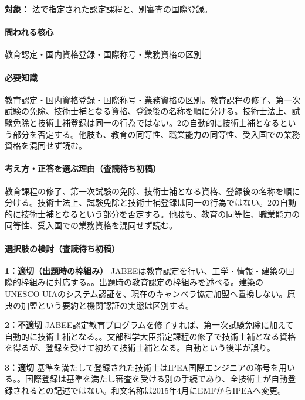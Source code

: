 \noindent\textbf{対象：} 法で指定された認定課程と、別審査の国際登録。\par

\paragraph{問われる核心} 教育認定・国内資格登録・国際称号・業務資格の区別

\paragraph{必要知識} 教育認定・国内資格登録・国際称号・業務資格の区別。教育課程の修了、第一次試験の免除、技術士補となる資格、登録後の名称を順に分ける。技術士法上、試験免除と技術士補登録は同一の行為ではない。2の自動的に技術士補となるという部分を否定する。他肢も、教育の同等性、職業能力の同等性、受入国での業務資格を混同せず読む。

\paragraph{考え方・正答を選ぶ理由（査読待ち初稿）} 教育課程の修了、第一次試験の免除、技術士補となる資格、登録後の名称を順に分ける。技術士法上、試験免除と技術士補登録は同一の行為ではない。2の自動的に技術士補となるという部分を否定する。他肢も、教育の同等性、職業能力の同等性、受入国での業務資格を混同せず読む。

\paragraph{選択肢の検討（査読待ち初稿）}\mbox{}\par

\noindent\textbf{1：適切（出題時の枠組み）} JABEEは教育認定を行い、工学・情報・建築の国際的枠組みに対応する。。出題時の教育認定の枠組みを述べる。建築のUNESCO-UIAのシステム認証を、現在のキャンベラ協定加盟へ置換しない。原典の加盟という要約と機関認証の実態は区別する。\par

\noindent\textbf{2：不適切} JABEE認定教育プログラムを修了すれば、第一次試験免除に加えて自動的に技術士補となる。。文部科学大臣指定課程の修了で技術士補となる資格を得るが、登録を受けて初めて技術士補となる。自動という後半が誤り。\par

\noindent\textbf{3：適切} 基準を満たして登録された技術士はIPEA国際エンジニアの称号を用いる。。国際登録は基準を満たし審査を受ける別の手続であり、全技術士が自動登録されるとの記述ではない。和文名称は2015年4月にEMFからIPEAへ変更。\par

